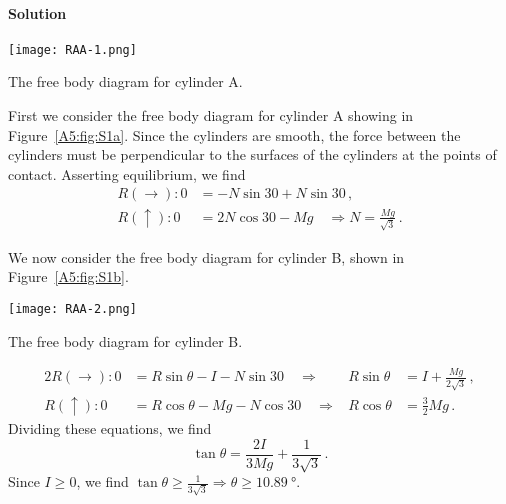 \documentclass[a4paper,justified,oneside]{tufte-handout}
\numberwithin{equation}{subsection}
\begin{document}
\begin{solution}
\paragraph{Solution}
\begin{marginfigure}[0mm]
	\centering
	\texttt{[image: RAA-1.png]}
	\caption{The free body diagram for cylinder A.}
	\label{A5:fig:S1a}
\end{marginfigure}
First we consider the free body diagram for cylinder A showing in Figure~\ref{A5:fig:S1a}. Since the cylinders are smooth, the force between the cylinders must be perpendicular to the surfaces of the cylinders at the points of contact. Asserting equilibrium, we find
\begin{align*}
	R\left(\rightarrow\right):	0&=	-N\sin 30 +N\sin 30	\,,\\
	R\left(\uparrow\right):	0&=2N\cos 30 - Mg	\quad\Rightarrow N=\frac{Mg}{\sqrt{3}}	\,.
\end{align*}

We now consider the free body diagram for cylinder B, shown in Figure~\ref{A5:fig:S1b}.
\begin{marginfigure}[0mm]
	\centering
	\texttt{[image: RAA-2.png]}
	\caption{The free body diagram for cylinder B.}
	\label{A5:fig:S1b}
\end{marginfigure}
\begin{alignat*}{2}
	R\left(\rightarrow\right):	0&=	R\sin\theta - I - N\sin 30 	\quad\Rightarrow&	R\sin \theta &= I +\frac{Mg}{2\sqrt{3}}\,,\\
	R\left(\uparrow\right):	0&=R\cos \theta - Mg - N\cos 30		\quad\Rightarrow& R\cos\theta &= \frac{3}{2}Mg\,.
\end{alignat*}
Dividing these equations, we find
\begin{equation*}
	\tan\theta=\frac{2I}{3Mg} + \frac{1}{3\sqrt{3}}\,.
\end{equation*}
Since $I\geq0$, we find $\tan\theta\geq \frac{1}{3\sqrt{3}} \Rightarrow \theta\geq\SI{10.89}{\degree}$.


\end{solution}
\end{document}
